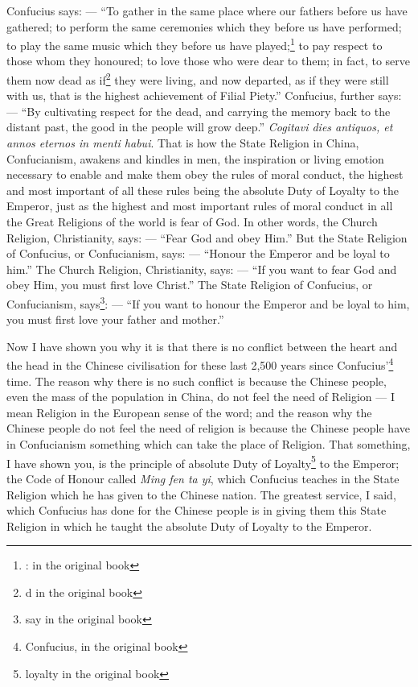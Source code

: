Confucius says: --- ``To gather in the same place where our fathers before us have gathered; to perform the same ceremonies which they before us have performed; to play the same music which they before us have played;\footnote{: in the original book} to pay respect to those whom they honoured; to love those who were dear to them; in fact, to serve them now dead as if\footnote{d in the original book} they were living, and now departed, as if they were still with us, that is the highest achievement of Filial Piety.''
Confucius, further says: --- ``By cultivating respect for the dead, and carrying the memory back to the distant past, the good in the people will grow deep.''
\emph{Cogitavi dies antiquos, et annos eternos in menti habui}. 
That is how the State Religion in China, Confucianism, awakens and kindles in men, the inspiration or living emotion necessary to enable and make them obey the rules of moral conduct, the highest and most important of all these rules being the absolute Duty of Loyalty to the Emperor, just as the highest and most important rules of moral conduct in all the Great Religions of the world is fear of God.
In other words, the Church Religion, Christianity, says: --- ``Fear God and obey Him.''
But the State Religion of Confucius, or Confucianism, says: --- ``Honour the Emperor and be loyal to him.''
The Church Religion, Christianity, says: --- ``If you want to fear God and obey Him, you must first love Christ.''
The State Religion of Confucius, or Confucianism, says\footnote{say in the original book}: --- ``If you want to honour the Emperor and be loyal to him, you must first love your father and mother.''

Now I have shown you why it is that there is no conflict between the heart and the head in the Chinese civilisation for these last 2,500 years since Confucius'\footnote{Confucius, in the original book} time.
The reason why there is no such conflict is because the Chinese people, even the mass of the population in China, do not feel the need of Religion --- I mean Religion in the European sense of the word; and the reason why the Chinese people do not feel the need of religion is because the Chinese people have in Confucianism something which can take the place of Religion.
That something, I have shown you, is the principle of absolute Duty of Loyalty\footnote{loyalty in the original book} to the Emperor; the Code of Honour called \emph{Ming fen ta yi}, which Confucius teaches in the State Religion which he has given to the Chinese nation.
The greatest service, I said, which Confucius has done for the Chinese people is in giving them this State Religion in which he taught the absolute Duty of Loyalty to the Emperor.

